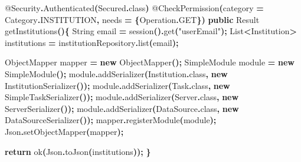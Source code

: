 \documentclass[
  11pt,
]{krantz}
\newenvironment{Shaded}{\begin{snugshade}}{\end{snugshade}}
\newcommand{\AttributeTok}[1]{\textcolor[rgb]{0.61,0.61,0.61}{#1}}
\newcommand{\BuiltInTok}[1]{#1}
\newcommand{\ControlFlowTok}[1]{\textcolor[rgb]{0.27,0.27,0.27}{\textbf{#1}}}
\newcommand{\FunctionTok}[1]{\textcolor[rgb]{0,0,0}{#1}}
\newcommand{\KeywordTok}[1]{\textcolor[rgb]{0.27,0.27,0.27}{\textbf{#1}}}
\newcommand{\NormalTok}[1]{#1}
\newcommand{\OperatorTok}[1]{\textcolor[rgb]{0.43,0.43,0.43}{\textbf{#1}}}
\newcommand{\StringTok}[1]{\textcolor[rgb]{0.5,0.5,0.5}{#1}}
\begin{document}
\begin{Shaded}
\begin{Highlighting}[]
\AttributeTok{@Security}\OperatorTok{.}\FunctionTok{Authenticated}\OperatorTok{(}\NormalTok{Secured}\OperatorTok{.}\FunctionTok{class}\OperatorTok{)}
\AttributeTok{@CheckPermission}\OperatorTok{(}\NormalTok{category }\OperatorTok{=}\NormalTok{ Category}\OperatorTok{.}\FunctionTok{INSTITUTION}\OperatorTok{,}\NormalTok{ needs }\OperatorTok{=} \OperatorTok{\{}\BuiltInTok{Operation}\OperatorTok{.}\FunctionTok{GET}\OperatorTok{\})}
\KeywordTok{public} \BuiltInTok{Result} \FunctionTok{getInstitutions}\OperatorTok{()\{}
    \BuiltInTok{String}\NormalTok{ email }\OperatorTok{=} \FunctionTok{session}\OperatorTok{().}\FunctionTok{get}\OperatorTok{(}\StringTok{"userEmail"}\OperatorTok{);}
    \BuiltInTok{List}\OperatorTok{\textless{}}\NormalTok{Institution}\OperatorTok{\textgreater{}}\NormalTok{ institutions }\OperatorTok{=}\NormalTok{ institutionRepository}\OperatorTok{.}\FunctionTok{list}\OperatorTok{(}\NormalTok{email}\OperatorTok{);}

\NormalTok{    ObjectMapper mapper }\OperatorTok{=} \KeywordTok{new} \FunctionTok{ObjectMapper}\OperatorTok{();}
\NormalTok{    SimpleModule module }\OperatorTok{=} \KeywordTok{new} \FunctionTok{SimpleModule}\OperatorTok{();}
\NormalTok{    module}\OperatorTok{.}\FunctionTok{addSerializer}\OperatorTok{(}\NormalTok{Institution}\OperatorTok{.}\FunctionTok{class}\OperatorTok{,} \KeywordTok{new} \FunctionTok{InstitutionSerializer}\OperatorTok{());}
\NormalTok{    module}\OperatorTok{.}\FunctionTok{addSerializer}\OperatorTok{(}\NormalTok{Task}\OperatorTok{.}\FunctionTok{class}\OperatorTok{,} \KeywordTok{new} \FunctionTok{SimpleTaskSerializer}\OperatorTok{());}
\NormalTok{    module}\OperatorTok{.}\FunctionTok{addSerializer}\OperatorTok{(}\NormalTok{Server}\OperatorTok{.}\FunctionTok{class}\OperatorTok{,} \KeywordTok{new} \FunctionTok{ServerSerializer}\OperatorTok{());}
\NormalTok{    module}\OperatorTok{.}\FunctionTok{addSerializer}\OperatorTok{(}\BuiltInTok{DataSource}\OperatorTok{.}\FunctionTok{class}\OperatorTok{,} \KeywordTok{new} \FunctionTok{DataSourceSerializer}\OperatorTok{());}
\NormalTok{    mapper}\OperatorTok{.}\FunctionTok{registerModule}\OperatorTok{(}\NormalTok{module}\OperatorTok{);}
\NormalTok{    Json}\OperatorTok{.}\FunctionTok{setObjectMapper}\OperatorTok{(}\NormalTok{mapper}\OperatorTok{);}

    \ControlFlowTok{return} \FunctionTok{ok}\OperatorTok{(}\NormalTok{Json}\OperatorTok{.}\FunctionTok{toJson}\OperatorTok{(}\NormalTok{institutions}\OperatorTok{));}
\OperatorTok{\}}
\end{Highlighting}
\end{Shaded}
\end{document}
